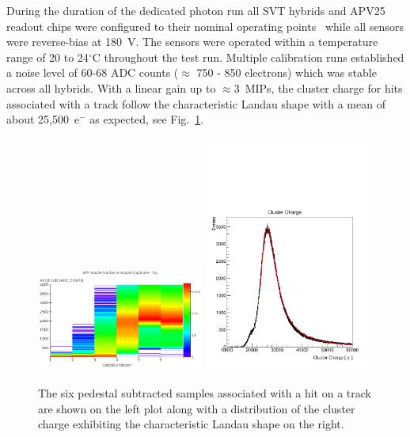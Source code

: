 During the duration of the dedicated photon run all SVT hybrids and APV25 
readout chips were configured to their nominal operating 
points~\cite{Jones:1069892} while all sensors were reverse-bias at 180~V.  The 
sensors were operated within a temperature range of  20 to 24$^\circ$C 
throughout the test run. Multiple calibration runs established a noise level of 60-68 
ADC counts ($\approx$ 750 - 850 electrons)  which was stable across all hybrids. With a linear gain up to $\approx 3$~MIPs, the 
cluster charge for hits associated with a track follow the characteristic Landau shape with a 
mean of about 25,500~e$^{-}$ as expected, see Fig.~\ref{fig:cluster_pulse}.
\begin{figure}[ht]
	\includegraphics[width=0.49\textwidth]{test2012/svtperformance/svt_calib/08062012_run1351_samples_vs_amplitude.png}
	\includegraphics[width=0.49\textwidth]{test2012/svtperformance/svt_calib/run1351_mip_small.pdf}
    \caption{The six pedestal subtracted samples associated with a hit on a track 
             are shown on the left plot along with a distribution of the cluster
             charge exhibiting the characteristic Landau shape on the right. 
            }
	\label{fig:cluster_pulse}
\end{figure}



